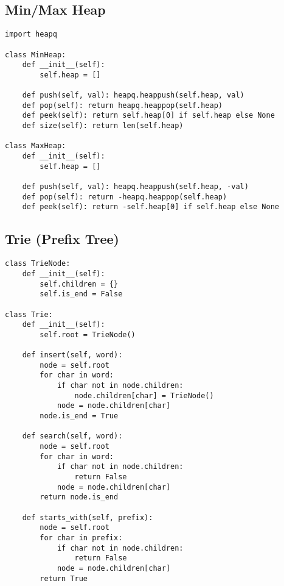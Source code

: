 \subsection{Min/Max Heap}
\begin{verbatim}
import heapq

class MinHeap:
    def __init__(self):
        self.heap = []
    
    def push(self, val): heapq.heappush(self.heap, val)
    def pop(self): return heapq.heappop(self.heap)
    def peek(self): return self.heap[0] if self.heap else None
    def size(self): return len(self.heap)

class MaxHeap:
    def __init__(self):
        self.heap = []
    
    def push(self, val): heapq.heappush(self.heap, -val)
    def pop(self): return -heapq.heappop(self.heap)
    def peek(self): return -self.heap[0] if self.heap else None
\end{verbatim}

\subsection{Trie (Prefix Tree)}
\begin{verbatim}
class TrieNode:
    def __init__(self):
        self.children = {}
        self.is_end = False

class Trie:
    def __init__(self):
        self.root = TrieNode()
    
    def insert(self, word):
        node = self.root
        for char in word:
            if char not in node.children:
                node.children[char] = TrieNode()
            node = node.children[char]
        node.is_end = True
    
    def search(self, word):
        node = self.root
        for char in word:
            if char not in node.children:
                return False
            node = node.children[char]
        return node.is_end
    
    def starts_with(self, prefix):
        node = self.root
        for char in prefix:
            if char not in node.children:
                return False
            node = node.children[char]
        return True
\end{verbatim}

